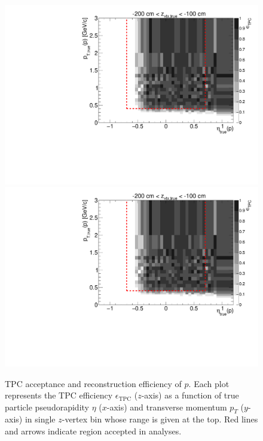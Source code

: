 \begin{figure}[hb]
\caption[TPC acceptance and reconstruction efficiency of $p$.]{TPC acceptance and reconstruction efficiency of $p$. Each plot represents the TPC efficiency $\epsilon_{\text{TPC}}$ ($z$-axis) as a function of true particle pseudorapidity $\eta$ ($x$-axis) and transverse momentum $p_{T}$ ($y$-axis) in single $z$-vertex bin whose range is given at the top. Red lines and arrows indicate region accepted in analyses.}\label{fig:eff_proton_plus}
\centering
\parbox{0.495\textwidth}{
  \centering
  \includegraphics[width=\linewidth,page=3]{graphics/eff/Eff2D_TPC_proton_Plus.pdf}\\
  \includegraphics[width=\linewidth,page=5]{graphics/eff/Eff2D_TPC_proton_Plus.pdf}\\
}
\end{figure}
